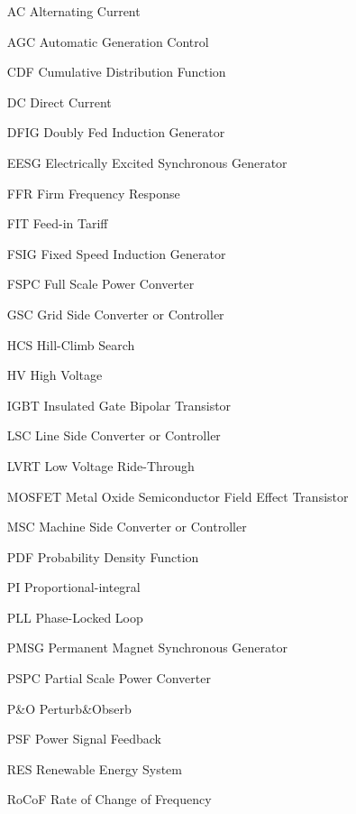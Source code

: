\begin{glossary}{}

\begin{itemize}[leftmargin=4.5em,align=parleft,labelsep=1cm]
	
\item[AC] 		Alternating Current
\item[AGC] 		Automatic Generation Control
\item[CDF] 		Cumulative Distribution Function
\item[DC] 		Direct Current
\item[DFIG] 	Doubly Fed Induction Generator
\item[EESG] 	Electrically Excited Synchronous Generator
\item[FFR] 		Firm Frequency Response
\item[FIT] 		Feed-in Tariff
\item[FSIG] 	Fixed Speed Induction Generator
\item[FSPC] 	Full Scale Power Converter
\item[GSC] 		Grid Side Converter or Controller
\item[HCS] 		Hill-Climb Search
\item[HV]		High Voltage
\item[IGBT] 	Insulated Gate Bipolar Transistor
\item[LSC] 		Line Side Converter or Controller
\item[LVRT] 	Low Voltage Ride-Through
\item[MOSFET] 	Metal Oxide Semiconductor Field Effect Transistor
\item[MSC] 		Machine Side Converter or Controller
\item[PDF] 		Probability Density Function
\item[PI] 		Proportional-integral
\item[PLL] 		Phase-Locked Loop
\item[PMSG] 	Permanent Magnet Synchronous Generator
\item[PSPC] 	Partial Scale Power Converter
\item[P\&O] 	Perturb\&Obserb
\item[PSF] 		Power Signal Feedback
\item[RES] 		Renewable Energy System
\item[RoCoF] 	Rate of Change of Frequency

\end{itemize}

\end{glossary}
